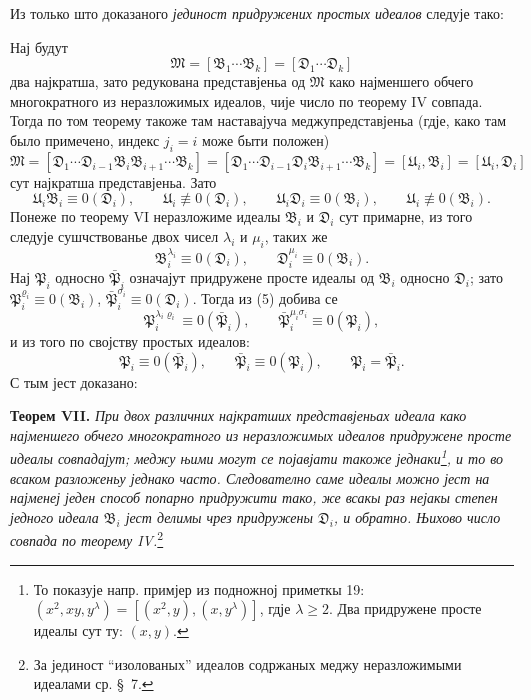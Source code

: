 ﻿\documentclass[11pt]{article}
\newcommand{\ideal}[1]{\mathfrak{#1}}
\begin{document}
Из только што доказаного \emph{јединост придружених простых идеалов} следује тако:

Нај будут
\[
 \ideal M=[\ideal B_1\cdots\ideal B_k]=[\ideal D_1\cdots\ideal D_k]
\]
два најкратша, зато редукована представјеньа од \(\ideal M\) како најменшего обчего многократного из неразложимых идеалов, чије число по теорему IV совпада. Тогда по том теорему такоже там наставајуча меджупредставјеньа (гдје, како там было примечено, индекс \(j_i=i\) може быти положен)
\[
 \ideal M=[\ideal D_1\cdots\ideal D_{i-1}\ideal B_i\ideal B_{i+1}\cdots\ideal B_k]
       =[\ideal D_1\cdots\ideal D_{i-1}\ideal D_i\ideal B_{i+1}\cdots\ideal B_k]
       =[\ideal U_i,\ideal B_i]=[\ideal U_i,\ideal D_i]
\]
сут најкратша представјеньа. Зато
\[
 \ideal U_i\ideal B_i\equiv0(\ideal D_i),\qquad \ideal U_i\not\equiv0(\ideal D_i),
 \qquad
 \ideal U_i\ideal D_i\equiv0(\ideal B_i),\qquad \ideal U_i\not\equiv0(\ideal B_i).
\]
Понеже по теорему VI неразложиме идеалы \(\ideal B_i\) и \(\ideal D_i\) сут примарне, из того следује сушчствованье двох чисел \(\lambda_i\) и \(\mu_i\), таких же
\begin{equation}
 \ideal B_i^{\lambda_i}\equiv0(\ideal D_i),
 \qquad
 \ideal D_i^{\mu_i}\equiv0(\ideal B_i).
\tag{5}
\end{equation}
Нај \(\ideal P_i\) односно \(\bar{\ideal P}_i\) означајут придружене просте идеалы од \(\ideal B_i\) односно \(\ideal D_i\); зато \(\ideal P_i^{\varrho_i}\equiv0(\ideal B_i)\), \(\bar{\ideal P}_i^{\sigma_i}\equiv0(\ideal D_i)\). Тогда из (5) добива се
\[
 \ideal P_i^{\lambda_i\varrho_i}\equiv0(\bar{\ideal P}_i),
 \qquad
 \bar{\ideal P}_i^{\mu_i\sigma_i}\equiv0(\ideal P_i),
\]
и из того по својству простых идеалов:
\[
 \ideal P_i\equiv0(\bar{\ideal P}_i),
 \qquad
 \bar{\ideal P}_i\equiv0(\ideal P_i),
 \qquad
 \ideal P_i=\bar{\ideal P}_i.
\]
С тым јест доказано:

\textbf{Теорем VII.} \emph{При двох различних најкратших представјеньах идеала како најменшего обчего многократного из неразложимых идеалов придружене просте идеалы совпадајут; меджу њими могут се појавјати такоже једнаки\footnote{То показује напр. примјер из подножној приметкы 19: \((x^2,xy,y^\lambda)=[(x^2,y),(x,y^\lambda)]\), гдје \(\lambda\ge2\). Два придружене просте идеалы сут ту: \((x,y)\).}, и то во всаком разложеньу једнако часто. Следователно саме идеалы можно јест на најменеј једен способ попарно придружити тако, же всакы раз нејакы степен једного идеала \(\ideal B_i\) јест делимы чрез придружены \(\ideal D_i\), и обратно. Њихово число совпада по теорему IV.}\footnote{За јединост ``изолованых'' идеалов содржаных меджу неразложимыми идеалами ср. \S~7.}
\end{document}
